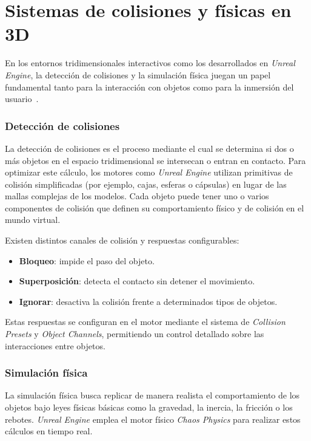 \section{Sistemas de colisiones y físicas en 3D}

En los entornos tridimensionales interactivos como los desarrollados en \textit{Unreal Engine}, la detección de colisiones y la simulación física juegan un papel fundamental tanto para la interacción con objetos como para la inmersión del usuario~\cite{unrealphysicsdocs}.

\subsubsection{Detección de colisiones}

La detección de colisiones es el proceso mediante el cual se determina si dos o más objetos en el espacio tridimensional se intersecan o entran en contacto. Para optimizar este cálculo, los motores como \textit{Unreal Engine} utilizan primitivas de colisión simplificadas (por ejemplo, cajas, esferas o cápsulas) en lugar de las mallas complejas de los modelos. Cada objeto puede tener uno o varios componentes de colisión que definen su comportamiento físico y de colisión en el mundo virtual.

Existen distintos canales de colisión y respuestas configurables:
\begin{itemize}
    \item \textbf{Bloqueo}: impide el paso del objeto.
    \item \textbf{Superposición}: detecta el contacto sin detener el movimiento.
    \item \textbf{Ignorar}: desactiva la colisión frente a determinados tipos de objetos.
\end{itemize}

Estas respuestas se configuran en el motor mediante el sistema de \textit{Collision Presets} y \textit{Object Channels}, permitiendo un control detallado sobre las interacciones entre objetos.

\subsubsection{Simulación física}

La simulación física busca replicar de manera realista el comportamiento de los objetos bajo leyes físicas básicas como la gravedad, la inercia, la fricción o los rebotes. \textit{Unreal Engine} emplea el motor físico \textit{Chaos Physics} para realizar estos cálculos en tiempo real.

